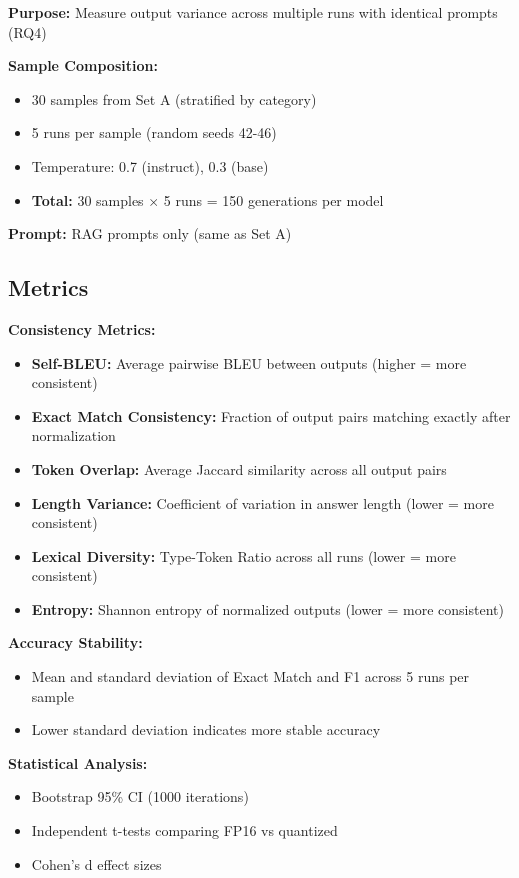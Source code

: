 \documentclass[11pt,a4paper]{article}
\begin{document}
\textbf{Purpose:} Measure output variance across multiple runs with identical prompts (RQ4)

\textbf{Sample Composition:}
\begin{itemize}
\item 30 samples from Set A (stratified by category)
\item 5 runs per sample (random seeds 42-46)
\item Temperature: 0.7 (instruct), 0.3 (base)
\item \textbf{Total:} 30 samples $\times$ 5 runs = 150 generations per model
\end{itemize}

\textbf{Prompt:} RAG prompts only (same as Set A)

\subsection{Metrics}

\textbf{Consistency Metrics:}
\begin{itemize}
\item \textbf{Self-BLEU:} Average pairwise BLEU between outputs (higher = more consistent)
\item \textbf{Exact Match Consistency:} Fraction of output pairs matching exactly after normalization
\item \textbf{Token Overlap:} Average Jaccard similarity across all output pairs
\item \textbf{Length Variance:} Coefficient of variation in answer length (lower = more consistent)
\item \textbf{Lexical Diversity:} Type-Token Ratio across all runs (lower = more consistent)
\item \textbf{Entropy:} Shannon entropy of normalized outputs (lower = more consistent)
\end{itemize}

\textbf{Accuracy Stability:}
\begin{itemize}
\item Mean and standard deviation of Exact Match and F1 across 5 runs per sample
\item Lower standard deviation indicates more stable accuracy
\end{itemize}

\textbf{Statistical Analysis:}
\begin{itemize}
\item Bootstrap 95\% CI (1000 iterations)
\item Independent t-tests comparing FP16 vs quantized
\item Cohen's d effect sizes
\end{itemize}
\end{document}
